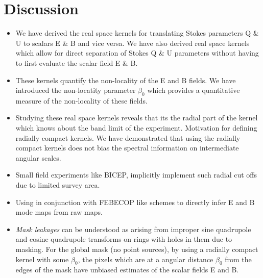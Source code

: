 \section{Discussion}\label{sec:discussion}
\begin{itemize}
\item We have derived the real space kernels for translating Stokes parameters Q \& U to scalars E \& B and vice versa. We have also derived real space kernels which allow for direct separation of Stokes Q \& U parameters without having to first evaluate the scalar field E \& B.

\item These kernels quantify the non-locality of the E and B fields. We have introduced the non-locatity parameter $\beta_0$ which provides a quantitative measure of the non-locality of these fields.  

\item Studying these real space kernels reveals that its the radial part of the kernel which knows about the band limit of the experiment. Motivation for defining radially compact kernels. We have demonstrated that using the radially compact kernels does not bias the spectral information on intermediate angular scales.

\item Small field experiments like BICEP, implicitly implement such radial cut offs due to limited survey area. 


\item Using in conjunction with FEBECOP \cite{febecop} like schemes to directly infer E and B mode maps from raw maps.

\item \textit{Mask leakages} can be understood as arising from improper sine quadrupole and cosine quadrupole transforms on rings with holes in them due to masking. For the global mask (no point sources), by using a radially compact kernel with some $\beta_0$, the pixels which are at a angular distance $\beta_0$ from the edges of the mask have unbiased estimates of the scalar fields E and B.

\end{itemize}
%
